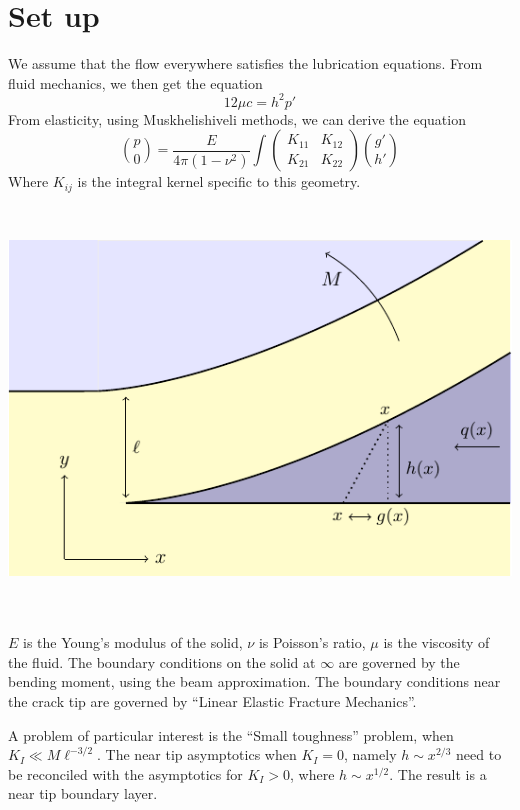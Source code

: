 \documentclass{article}
\begin{document}
\section*{Set up}
\begin{minipage}{0.5\linewidth}
We assume that the flow everywhere satisfies the lubrication equations. From 
fluid mechanics, we then get the equation
\[12\mu c = h^2 p'\]
From elasticity, using Muskhelishiveli methods, we can derive the equation
\[
{ p \choose 0 }  =
\frac{E}{4\pi (1-\nu^2)} \int
\left(\begin{array}{cc} K_{11} & K_{12} \\ K_{21} & K_{22} \end{array} \right)
{ g' \choose h' }  \]
Where $K_{ij}$ is the integral kernel specific to this geometry.
\end{minipage}
\begin{minipage}{0.07\linewidth}
~
\end{minipage}
\begin{minipage}{0.4\linewidth}
\includegraphics[scale=0.75]{Fig1.pdf}
\end{minipage}
\\
\\
$E$ is the Young's modulus of the solid, $\nu$ is Poisson's ratio, $\mu$ is 
the viscosity of the fluid.
The boundary conditions on the solid at $\infty$ are governed by the bending 
moment, using the beam approximation. The boundary conditions near the crack
tip are governed by ``Linear Elastic Fracture Mechanics''. 

A problem of 
particular interest is the ``Small toughness'' problem, when 
$K_I \ll M \ell^{-3/2}$. The near tip asymptotics when $K_I=0$, namely
$h \sim x^{2/3}$ need to be reconciled with the asymptotics for 
$K_I>0$, where $h \sim x^{1/2}$. The result is a near tip boundary layer.
\end{document}
